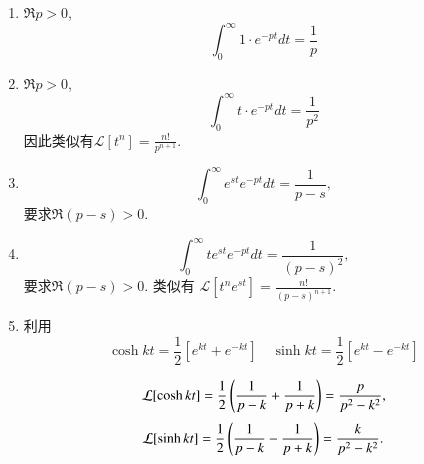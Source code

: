 \begin{solution}
        


    \begin{enumerate}
        \item $\Re p > 0$, 
            $$\int_{0}^{\infty} 1 \cdot e^{-p t} dt = \frac{1}{p}$$
        \item  $\Re p > 0$, 
            $$\int_{0}^{\infty} t \cdot e^{-p t} dt = \frac{1}{p^2}$$
            因此类似有$\mathcal{L}[t^n] = \frac{n!}{p^{n+1}}$.
        \item $$
            \int_{0}^{\infty} e^{s t} e^{-p t} dt = \frac{1}{p-s} , 
        $$
        要求$\Re (p-s) > 0$.
        \item 
        $$
        \int_{0}^{\infty} t e^{s t} e^{-p t} dt = \frac{1}{(p-s)^2} ,
        $$
        要求$\Re (p-s) > 0$.  
    类似有 $\mathcal{L}[t^n e^{s t}] = \frac{n!}{(p-s)^{n+1}}$.
        \item 利用
        $$
         \cosh{k t}  = \frac{1}{2} \left[ e^{kt} + e^{-kt}\right] \quad 
         \sinh{k t}  = \frac{1}{2} \left[ e^{kt} - e^{-kt}\right] 
        $$

        $$
        \mathcal{L}[ \cosh{k t} ] = {\frac{1}{2}} \left( \frac{1}{p-k} + \frac{1}{p+k} \right) = \frac{p}{p^2 - k^2} ,
        $$
        $$
        \mathcal{L}[ \sinh{k t} ] = {\frac{1}{2}} \left( \frac{1}{p-k} - \frac{1}{p+k} \right) = \frac{k}{p^2 - k^2} .
        $$
    \end{enumerate}
\end{solution}

